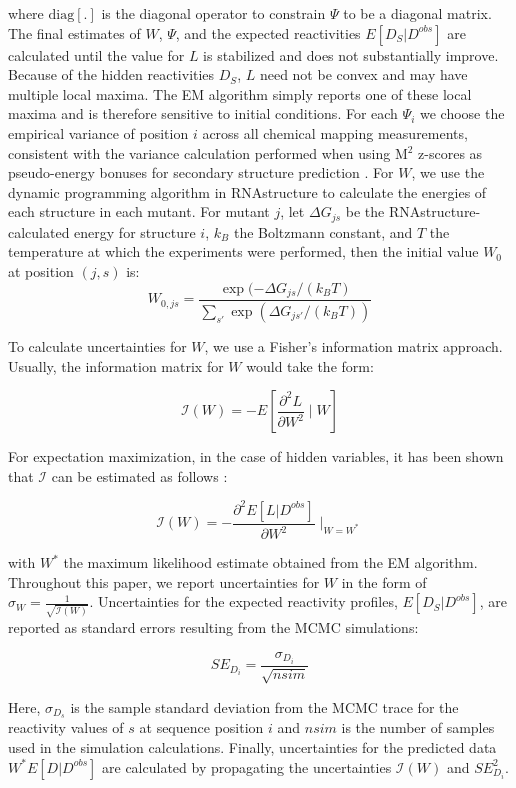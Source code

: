 \documentclass[12pt]{article}
\begin{document}
where $\mbox{diag}[.]$ is the diagonal operator to constrain $\Psi$ to be a diagonal matrix. The final estimates of $W$, $\Psi$, and the expected reactivities $E[D_S|D^{obs}]$ are calculated until the value for $L$ is stabilized and does not substantially improve.\\

Because of the hidden reactivities $D_S$, $L$ need not be convex and may have multiple local maxima. The EM algorithm simply reports one of these local maxima and is therefore sensitive to initial conditions. For each $\Psi_{i}$ we choose the empirical variance of position $i$ across all chemical mapping measurements, consistent with the variance calculation performed when using M$^2$ z-scores as pseudo-energy bonuses for secondary structure prediction \cite{Kladwang2011f}. For $W$, we use the dynamic programming algorithm in RNAstructure to calculate the energies of each structure in each mutant. For mutant $j$, let $\Delta G_{js}$ be the RNAstructure-calculated energy for structure $i$, $k_B$ the Boltzmann constant, and $T$ the temperature at which the experiments were performed, then the initial value $W_0$ at position $(j,s)$ is:
\[W_{0,js} = \frac{\exp(-\Delta G_{js}/(k_BT)}{\sum_{s'} \exp(\Delta G_{js'}/(k_BT))}\]

To calculate uncertainties for $W$, we use a Fisher's information matrix approach. Usually, the information matrix for $W$ would take the form:

\[\mathcal{I}(W) = -E\left[\frac{\partial^2 L}{\partial W^2} \mid W\right]\]

For expectation maximization, in the case of hidden variables, it has been shown that $\mathcal{I}$ can be estimated as follows \cite{Oakes1999}:

\[\mathcal{I}(W) = -\frac{\partial^2 E[L| D^{obs}]}{\partial W^2}\mid_{W=W^*}\]
 
with $W^*$ the maximum likelihood estimate obtained from the EM algorithm. Throughout this paper, we report uncertainties for $W$ in the form of $\sigma_W = \frac{1}{\sqrt{\mathcal{I}(W)}}$. Uncertainties for the expected reactivity profiles, $E[D_S|D^{obs}]$, are reported as standard errors resulting from the MCMC simulations:

\[SE_{D_{i}} = \frac{\sigma_{D_{i}}}{\sqrt{nsim}}\]

Here, $\sigma_{D_{s}}$ is the sample standard deviation from the MCMC trace for the reactivity values of $s$ at sequence position $i$ and $nsim$ is the number of samples used in the simulation calculations. Finally, uncertainties for the predicted data $W^*E[D|D^{obs}]$ are calculated by propagating the uncertainties $\mathcal{I}(W)$ and $SE_{D_{i}}^2$.
\end{document}
